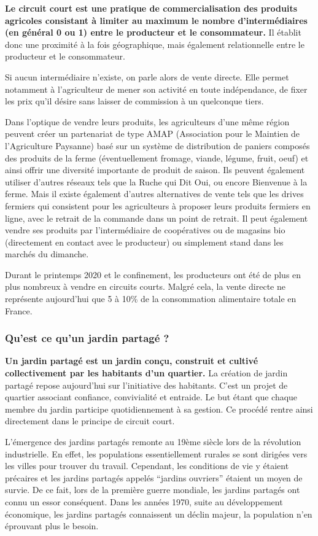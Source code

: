 \documentclass[french,a4paper]{article}
\begin{document}
\textbf{Le circuit court est une pratique de commercialisation des produits agricoles consistant à limiter au maximum le nombre d’intermédiaires (en général 0 ou 1) entre le producteur et le consommateur.} Il établit donc une proximité à la fois géographique, mais également relationnelle entre le producteur et le consommateur.

Si aucun intermédiaire n’existe, on parle alors de vente directe. Elle permet notamment à l’agriculteur de mener son activité en toute indépendance, de fixer les prix qu’il désire sans laisser de commission à un quelconque tiers.

Dans l’optique de vendre leurs produits, les agriculteurs d’une même région peuvent créer un partenariat de type AMAP (Association pour le Maintien de l'Agriculture Paysanne) basé sur un système de distribution de paniers  composés des produits de la ferme (éventuellement fromage, viande, légume, fruit, oeuf) et ainsi offrir une diversité importante de produit de saison. Ils peuvent également utiliser d'autres réseaux tels que la Ruche qui Dit Oui, ou encore Bienvenue à la ferme. Mais il existe également d’autres alternatives de vente tels que les drives fermiers qui consistent pour les agriculteurs à proposer leurs produits fermiers en ligne, avec le retrait de la commande dans un point de retrait. Il peut également vendre ses produits par l’intermédiaire de coopératives ou de magasins bio (directement en contact avec le producteur) ou simplement stand dans les marchés du dimanche.

Durant le printemps 2020 et le confinement, les producteurs ont été de plus en plus nombreux à vendre en circuits courts. Malgré cela, la vente directe ne représente aujourd’hui que 5 à 10\% de la consommation alimentaire totale en France.
\subsubsection{Qu’est ce qu’un jardin partagé ?}
\textbf{Un jardin partagé est un jardin conçu, construit et cultivé collectivement par les habitants d’un quartier.} La création de jardin partagé repose aujourd’hui sur l’initiative des habitants. C’est un projet de quartier associant confiance, convivialité et entraide. Le but étant que chaque membre du jardin participe quotidiennement à sa gestion. Ce procédé rentre ainsi directement dans le principe de circuit court. 

L’émergence des jardins partagés remonte au 19ème siècle lors de la révolution industrielle. En effet, les populations essentiellement rurales se sont dirigées vers les villes pour trouver du travail. Cependant, les conditions de vie y étaient précaires et les jardins partagés appelés  “jardins ouvriers” étaient un moyen de survie. De ce fait, lors de la première guerre mondiale, les jardins partagés ont connu un essor conséquent. Dans les années 1970, suite au développement économique, les jardins partagés connaissent un déclin majeur, la population n'en éprouvant plus le besoin.
\end{document}
